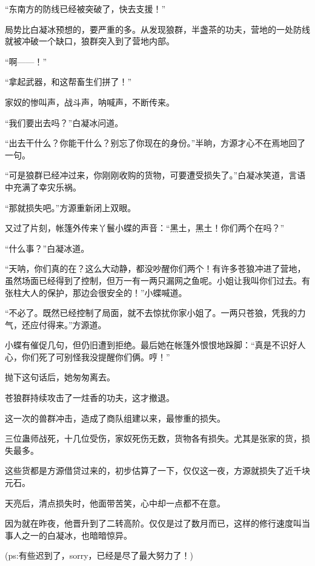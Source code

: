 \begin{this_body}
“东南方的防线已经被突破了，快去支援！”

局势比白凝冰预想的，要严重的多。从发现狼群，半盏茶的功夫，营地的一处防线就被冲破一个缺口，狼群突入到了营地内部。

“啊——！”

“拿起武器，和这帮畜生们拼了！”

家奴的惨叫声，战斗声，呐喊声，不断传来。

“我们要出去吗？”白凝冰问道。

“出去干什么？你能干什么？别忘了你现在的身份。”半晌，方源才心不在焉地回了一句。

“可是狼群已经冲过来，你刚刚收购的货物，可要遭受损失了。”白凝冰笑道，言语中充满了幸灾乐祸。

“那就损失吧。”方源重新闭上双眼。

又过了片刻，帐篷外传来丫鬟小蝶的声音：“黑土，黑土！你们两个在吗？”

“什么事？”白凝冰道。

“天呐，你们真的在？这么大动静，都没吵醒你们两个！有许多苍狼冲进了营地，虽然场面已经得到了控制，但万一有一两只漏网之鱼呢。小姐让我叫你们过去。有张柱大人的保护，那边会很安全的！”小蝶喊道。

“不必了。既然已经控制了局面，就不去惊扰你家小姐了。一两只苍狼，凭我的力气，还应付得来。”方源道。

小蝶有催促几句，但仍旧遭到拒绝。最后她在帐篷外恨恨地跺脚：“真是不识好人心，你们死了可别怪我没提醒你们俩。哼！”

抛下这句话后，她匆匆离去。

苍狼群持续攻击了一炷香的功夫，这才撤退。

这一次的兽群冲击，造成了商队组建以来，最惨重的损失。

三位蛊师战死，十几位受伤，家奴死伤无数，货物各有损失。尤其是张家的货，损失最多。

这些货都是方源借贷过来的，初步估算了一下，仅仅这一夜，方源就损失了近千块元石。

天亮后，清点损失时，他面带苦笑，心中却一点都不在意。

因为就在昨夜，他晋升到了二转高阶。仅仅是过了数月而已，这样的修行速度叫当事人之一的白凝冰，也暗暗惊异。

(ps:有些迟到了，sorry，已经是尽了最大努力了！)

\end{this_body}

